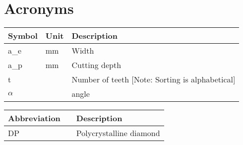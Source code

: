 
\toc %

\chapter{Acronyms} 
\newcommand{\rowheight}{3ex}
\begin{table}[ht!]
	\begin{tabularx}{\dimexpr\textwidth}{p{3cm} p{3cm} X}
		\textbf{Symbol} & \textbf{Unit} & \textbf{Description}   \\ \midrule
		a\_e                   & mm               & Width \\[\rowheight]
		a\_p                   & mm               & Cutting depth \\[\rowheight]
		t            		   &                  & Number of teeth [Note: Sorting is alphabetical] \\[\rowheight]
		$\alpha$               &                  & angle \\[\rowheight]
	\end{tabularx}
\end{table}

\begin{table}[ht!]
	\begin{tabularx}{\dimexpr\textwidth}{p{6cm}p{0cm} X}
		\textbf{Abbreviation} && \textbf{Description}   \\ \midrule
		DP                    && Polycrystalline diamond \\[\rowheight]
	\end{tabularx}
\end{table}

\loflot %
